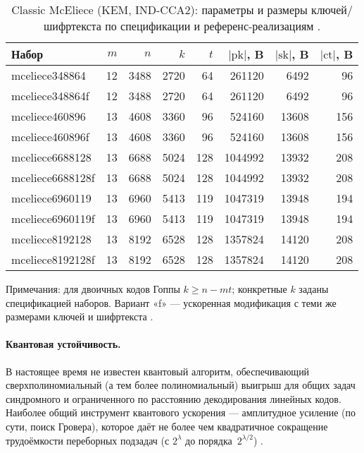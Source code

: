 \begin{table}[H]     %
  \centering
  \caption{Classic McEliece (KEM, IND-CCA2): параметры и размеры ключей/шифртекста по спецификации и референс-реализациям \cite{ClassicMcEliece2020,OQSClassicMcEliece}.}
  \label{tab:cmce-sizes}
  \small
  \begin{tabular}{lrrrrrrr}
    \toprule
    Набор & \(m\) & \(n\) & \(k\) & \(t\) & \(|\mathrm{pk}|\), B & \(|\mathrm{sk}|\), B & \(|\mathrm{ct}|\), B \\
    \midrule
    mceliece348864   & 12 & 3488 & 2720 &  64 &  261120 &  6492 &  96 \\
    mceliece348864f  & 12 & 3488 & 2720 &  64 &  261120 &  6492 &  96 \\
    mceliece460896   & 13 & 4608 & 3360 &  96 &  524160 & 13608 & 156 \\
    mceliece460896f  & 13 & 4608 & 3360 &  96 &  524160 & 13608 & 156 \\
    mceliece6688128  & 13 & 6688 & 5024 & 128 & 1044992 & 13932 & 208 \\
    mceliece6688128f & 13 & 6688 & 5024 & 128 & 1044992 & 13932 & 208 \\
    mceliece6960119  & 13 & 6960 & 5413 & 119 & 1047319 & 13948 & 194 \\
    mceliece6960119f & 13 & 6960 & 5413 & 119 & 1047319 & 13948 & 194 \\
    mceliece8192128  & 13 & 8192 & 6528 & 128 & 1357824 & 14120 & 208 \\
    mceliece8192128f & 13 & 8192 & 6528 & 128 & 1357824 & 14120 & 208 \\
    \bottomrule
  \end{tabular}

  \vspace{2pt}
  \par\footnotesize
  Примечания: для двоичных кодов Гоппы \(k \ge n - m t\); конкретные \(k\) заданы спецификацией наборов. Вариант «f» — ускоренная модификация с теми же размерами ключей и шифртекста \cite{ClassicMcEliece2020}.
\end{table}



\paragraph{Квантовая устойчивость.}
В настоящее время не известен квантовый алгоритм, обеспечивающий сверхполиномиальный (а тем более полиномиальный) выигрыш для общих задач синдромного и ограниченного по расстоянию декодирования линейных кодов. Наиболее общий инструмент квантового ускорения — амплитудное усиление (по сути, поиск Гровера), которое даёт не более чем квадратичное сокращение трудоёмкости переборных подзадач (с \(2^{\lambda}\) до порядка \(\,2^{\lambda/2}\)) \cite{Grover1996}.


